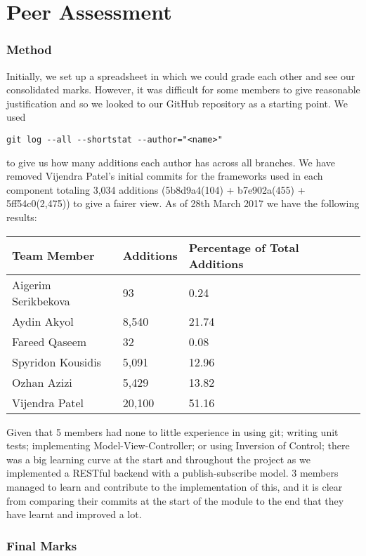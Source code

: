 \documentclass[11pt,a4paper]{report}
\begin{document}
\chapter{Peer Assessment}

\subsection{Method}
Initially, we set up a spreadsheet in which we could grade each other and see our consolidated marks. However, it was difficult for some members to give reasonable justification and so we looked to our GitHub repository as a starting point. We used \begin{verbatim}git log --all --shortstat --author="<name>"\end{verbatim} to give us how many additions each author has across all branches. We have removed Vijendra Patel's initial commits for the frameworks used in each component totaling 3,034 additions (5b8d9a4(104) + b7e902a(455) + 5ff54c0(2,475)) to give a fairer view. As of 28th March 2017 we have the following results:

\begin{center}
\begin{tabular}{| l | l | l |}
  \hline
  Team Member & Additions & Percentage of Total Additions\\
  \hline
  Aigerim Serikbekova & 93 & 0.24\\
  \hline
  Aydin Akyol & 8,540 & 21.74\\
  \hline
  Fareed Qaseem & 32 & 0.08\\
  \hline
  Spyridon Kousidis & 5,091 & 12.96\\
  \hline
  Ozhan Azizi & 5,429 & 13.82\\
  \hline
  Vijendra Patel & 20,100 & 51.16\\
  \hline
\end{tabular}
\end{center}

Given that 5 members had none to little experience in using git; writing unit tests; implementing Model-View-Controller; or using Inversion of Control; there was a big learning curve at the start and throughout the project as we implemented a RESTful backend with a publish-subscribe model. 3 members managed to learn and contribute to the implementation of this, and it is clear from comparing their commits at the start of the module to the end that they have learnt and improved a lot.

\subsection{Final Marks}
\end{document}
